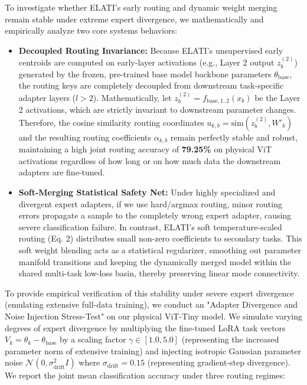 To investigate whether ELATI's early routing and dynamic weight merging remain stable under extreme expert divergence, we mathematically and empirically analyze two core systems behaviors:
\begin{itemize}
    \item \textbf{Decoupled Routing Invariance:} Because ELATI's unsupervised early centroids are computed on early-layer activations (e.g., Layer 2 output $z_b^{(2)}$) generated by the frozen, pre-trained base model backbone parameters $\theta_{\text{base}}$, the routing keys are completely decoupled from downstream task-specific adapter layers ($l > 2$). Mathematically, let $z_b^{(2)} = f_{\text{base}, 1..2}(x_b)$ be the Layer 2 activations, which are strictly invariant to downstream parameter changes. Therefore, the cosine similarity routing coordinates $u_{k, b} = \text{sim}(z_b^{(2)}, W'_k)$ and the resulting routing coefficients $\alpha_{k, b}$ remain perfectly stable and robust, maintaining a high joint routing accuracy of \textbf{79.25\%} on physical ViT activations regardless of how long or on how much data the downstream adapters are fine-tuned.
    \item \textbf{Soft-Merging Statistical Safety Net:} Under highly specialized and divergent expert adapters, if we use hard/argmax routing, minor routing errors propagate a sample to the completely wrong expert adapter, causing severe classification failure. In contrast, ELATI's soft temperature-scaled routing (Eq. 2) distributes small non-zero coefficients to secondary tasks. This soft weight blending acts as a statistical regularizer, smoothing out parameter manifold transitions and keeping the dynamically merged model within the shared multi-task low-loss basin, thereby preserving linear mode connectivity.
\end{itemize}

To provide empirical verification of this stability under severe expert divergence (emulating extensive full-data training), we conduct an "Adapter Divergence and Noise Injection Stress-Test" on our physical ViT-Tiny model. We simulate varying degrees of expert divergence by multiplying the fine-tuned LoRA task vectors $V_k = \theta_k - \theta_{\text{base}}$ by a scaling factor $\gamma \in [1.0, 5.0]$ (representing the increased parameter norm of extensive training) and injecting isotropic Gaussian parameter noise $\mathcal{N}(0, \sigma^2_{\text{drift}} I)$ where $\sigma_{\text{drift}} = 0.15$ (representing gradient-step divergence). We report the joint mean classification accuracy under three routing regimes:

